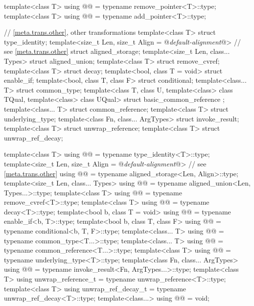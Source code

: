 \begin{codeblock}
{  template<class T>
    using @@ = typename remove_pointer<T>::type;
  template<class T>
    using @@    = typename add_pointer<T>::type;

  // \ref{meta.trans.other}, other transformations
  template<class T> struct type_identity;
  template<size_t Len, size_t Align = @\textit{default-alignment}@> // see \ref{meta.trans.other}
    struct aligned_storage;
  template<size_t Len, class... Types> struct aligned_union;
  template<class T> struct remove_cvref;
  template<class T> struct decay;
  template<bool, class T = void> struct enable_if;
  template<bool, class T, class F> struct conditional;
  template<class... T> struct common_type;
  template<class T, class U, template<class> class TQual, template<class> class UQual>
    struct basic_common_reference { };
  template<class... T> struct common_reference;
  template<class T> struct underlying_type;
  template<class Fn, class... ArgTypes> struct invoke_result;
  template<class T> struct unwrap_reference;
  template<class T> struct unwrap_ref_decay;

  template<class T>
    using @@    = typename type_identity<T>::type;
  template<size_t Len, size_t Align = @\textit{default-alignment}@> // see \ref{meta.trans.other}
    using @@  = typename aligned_storage<Len, Align>::type;
  template<size_t Len, class... Types>
    using @@    = typename aligned_union<Len, Types...>::type;
  template<class T>
    using @@     = typename remove_cvref<T>::type;
  template<class T>
    using @@            = typename decay<T>::type;
  template<bool b, class T = void>
    using @@        = typename enable_if<b, T>::type;
  template<bool b, class T, class F>
    using @@      = typename conditional<b, T, F>::type;
  template<class... T>
    using @@      = typename common_type<T...>::type;
  template<class... T>
    using @@ = typename common_reference<T...>::type;
  template<class T>
    using @@  = typename underlying_type<T>::type;
  template<class Fn, class... ArgTypes>
    using @@    = typename invoke_result<Fn, ArgTypes...>::type;
  template<class T>
    using unwrap_reference_t = typename unwrap_reference<T>::type;
  template<class T>
    using unwrap_ref_decay_t = typename unwrap_ref_decay<T>::type;
  template<class...>
    using @@             = void;

}
\end{codeblock}

